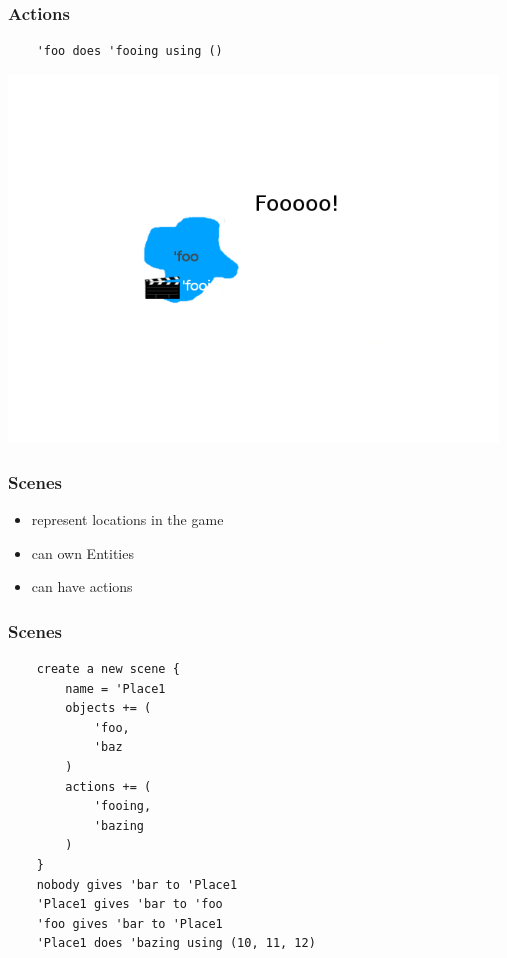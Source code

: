 \documentclass{beamer}
\begin{document}
\begin{frame}[fragile]
    \frametitle{Actions}
    \begin{lstlisting}
    'foo does 'fooing using ()
    \end{lstlisting}
    \pause
    \includegraphics[width=13cm]{foo-inst-fooing}
\end{frame}

\begin{frame}
    \frametitle{Scenes}
    \begin{itemize}[<+->]
        \item{represent locations in the game}
        \item{can own Entities}
        \item{can have actions}
    \end{itemize}
\end{frame}

\begin{frame}[fragile]
    \frametitle{Scenes}
    \begin{lstlisting}
    create a new scene {
        name = 'Place1
        objects += (
            'foo,
            'baz
        )
        actions += (
            'fooing,
            'bazing
        )
    }
    nobody gives 'bar to 'Place1
    'Place1 gives 'bar to 'foo
    'foo gives 'bar to 'Place1
    'Place1 does 'bazing using (10, 11, 12)
    \end{lstlisting}
\end{frame}
\end{document}
